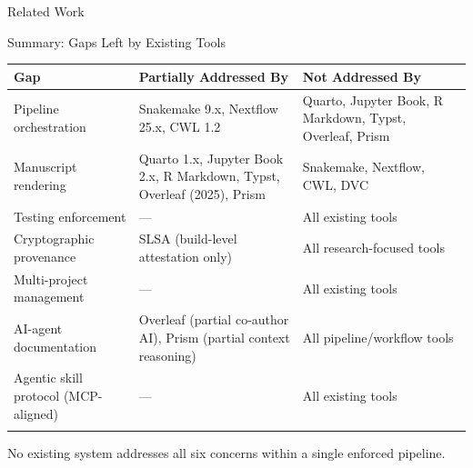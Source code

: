 \documentclass[
  ignorenonframetext,
]{beamer}
\newcounter{none} %
\begin{document}
\begin{frame}{Related Work}
\begin{block}{Summary: Gaps Left by Existing Tools}
{\def\LTcaptype{none} %
\begin{longtable}[]{@{}
  >{\raggedright\arraybackslash}p{}
  >{\raggedright\arraybackslash}p{}
  >{\raggedright\arraybackslash}p{}@{}}
\toprule\noalign{}
\begin{minipage}[b]{\linewidth}\raggedright
Gap
\end{minipage} & \begin{minipage}[b]{\linewidth}\raggedright
Partially Addressed By
\end{minipage} & \begin{minipage}[b]{\linewidth}\raggedright
Not Addressed By
\end{minipage} \\
\midrule\noalign{}
\endhead
Pipeline orchestration & Snakemake 9.x, Nextflow 25.x, CWL 1.2 & Quarto,
Jupyter Book, R Markdown, Typst, Overleaf, Prism \\
Manuscript rendering & Quarto 1.x, Jupyter Book 2.x, R Markdown, Typst,
Overleaf (2025), Prism & Snakemake, Nextflow, CWL, DVC \\
Testing enforcement & --- & All existing tools \\
Cryptographic provenance & SLSA (build-level attestation only) & All
research-focused tools \\
Multi-project management & --- & All existing tools \\
AI-agent documentation & Overleaf (partial co-author AI), Prism (partial
context reasoning) & All pipeline/workflow tools \\
Agentic skill protocol (MCP-aligned) & --- & All existing tools \\
\bottomrule\noalign{}
\end{longtable}
}

No existing system addresses all six concerns within a single enforced
pipeline.
\end{block}
\end{frame}
\end{document}
